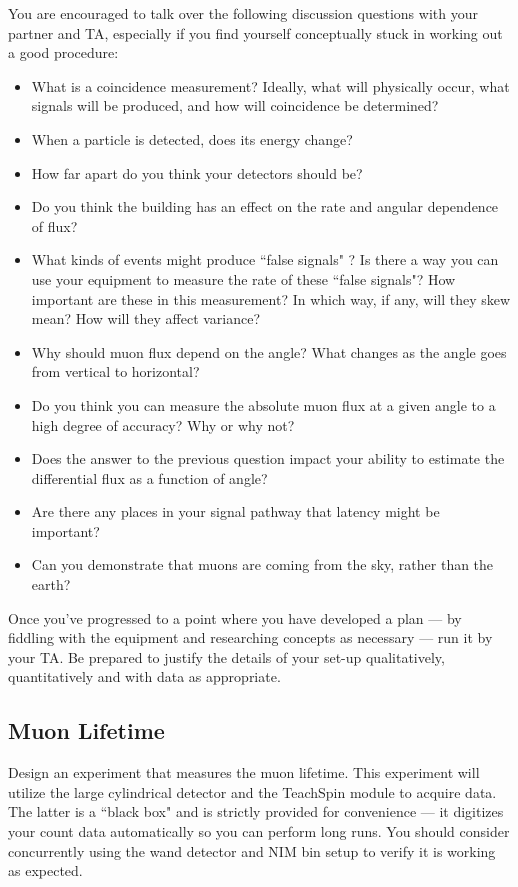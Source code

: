 \documentclass[aps,prb,groupedaddress,notitlepage,nofootinbib]{revtex4-1} %
\begin{document}
You are encouraged to talk over the following discussion questions with your partner and TA, especially if you find yourself conceptually stuck in working out a good procedure:

{
\begin{itemize}
\item What is a coincidence measurement? Ideally, what will physically occur, what signals will be produced, and how will coincidence be determined?
\item When a particle is detected, does its energy change?
\item How far apart do you think your detectors should be?
\item Do you think the building has an effect on the rate and angular dependence of flux?
\item What kinds of events might produce ``false signals" ? Is there a way you can use your equipment to measure the rate of these ``false signals"? How important are these in this measurement? In which way, if any, will they skew mean? How will they affect variance?
\item Why should muon flux depend on the angle? What changes as the angle goes from vertical to horizontal?
\item Do you think you can measure the absolute muon flux at a given angle to a high degree of accuracy? Why or why not?
\item Does the answer to the previous question impact your ability to estimate the differential flux as a function of angle?
\item Are there any places in your signal pathway that latency might be important? 
\item Can you demonstrate that muons are coming from the sky, rather than the earth?
\end{itemize}}

Once you've progressed to a point where you have developed a plan --- by fiddling with the equipment and researching concepts as necessary --- run it by your TA. Be prepared to justify the details of your set-up qualitatively, quantitatively  and with data as appropriate.


\subsection{Muon Lifetime}
Design an experiment that measures the muon lifetime. This experiment will utilize the large cylindrical detector and the TeachSpin module to acquire data. The latter is a ``black box" and is strictly provided for convenience --- it digitizes your count data automatically so you can perform long runs. You should consider concurrently using the wand detector and NIM bin  setup to verify it is working as expected. 
\end{document}

